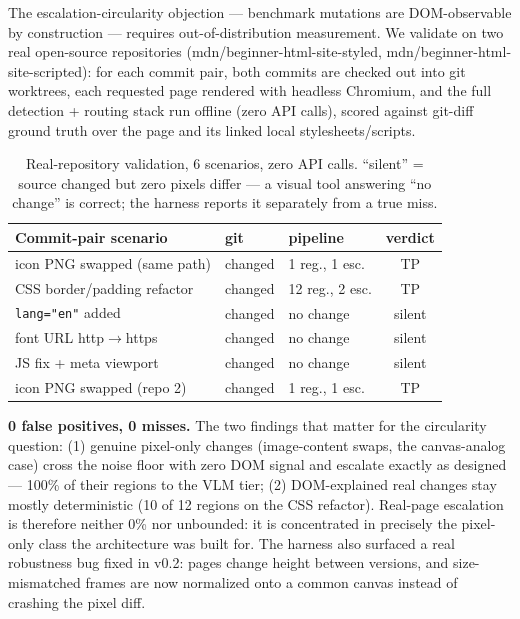 \documentclass[10pt,twocolumn,letterpaper]{article}
\begin{document}
The escalation-circularity objection — benchmark mutations are DOM-observable by construction — requires out-of-distribution measurement. We validate on two real open-source repositories (mdn/beginner-html-site-styled, mdn/beginner-html-site-scripted): for each commit pair, both commits are checked out into git worktrees, each requested page rendered with headless Chromium, and the full detection + routing stack run offline (zero API calls), scored against git-diff ground truth over the page and its linked local stylesheets/scripts.

\begin{table}[h]
\centering
\small
\begin{tabular}{lllc}
\toprule
\textbf{Commit-pair scenario} & \textbf{git} & \textbf{pipeline} & \textbf{verdict} \\
\midrule
icon PNG swapped (same path) & changed & 1 reg., 1 esc. & TP \\
CSS border/padding refactor & changed & 12 reg., 2 esc. & TP \\
\texttt{lang="en"} added & changed & no change & silent \\
font URL http$\to$https & changed & no change & silent \\
JS fix + meta viewport & changed & no change & silent \\
icon PNG swapped (repo 2) & changed & 1 reg., 1 esc. & TP \\
\bottomrule
\end{tabular}
\caption{Real-repository validation, 6 scenarios, zero API calls. ``silent'' = source changed but zero pixels differ — a visual tool answering ``no change'' is correct; the harness reports it separately from a true miss.}
\label{tab:realworld}
\end{table}

\textbf{0 false positives, 0 misses.} The two findings that matter for the circularity question: (1) genuine pixel-only changes (image-content swaps, the canvas-analog case) cross the noise floor with zero DOM signal and escalate exactly as designed — 100\% of their regions to the VLM tier; (2) DOM-explained real changes stay mostly deterministic (10 of 12 regions on the CSS refactor). Real-page escalation is therefore neither 0\% nor unbounded: it is concentrated in precisely the pixel-only class the architecture was built for. The harness also surfaced a real robustness bug fixed in v0.2: pages change height between versions, and size-mismatched frames are now normalized onto a common canvas instead of crashing the pixel diff.
\end{document}
